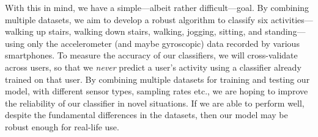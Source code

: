 With this in mind, we have a simple---albeit rather difficult---goal. By combining multiple datasets, we aim to develop a robust algorithm to classify six activities---walking up stairs, walking down stairs, walking, jogging, sitting, and standing---using only the accelerometer (and maybe gyroscopic) data recorded by various smartphones. To measure the accuracy of our classifiers, we will cross-validate across users, so that we \textit{never} predict a user's activity using a classifier already trained on that user. By combining multiple datasets for training and testing our model, with different sensor types, sampling rates etc., we are hoping to improve the reliability of our classifier in novel situations. If we are able to perform well, despite the fundamental differences in the datasets, then our model may be robust enough for real-life use.
